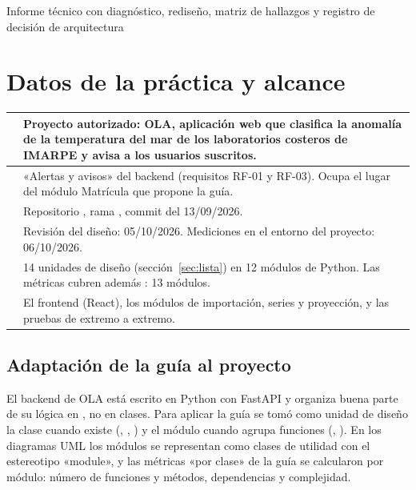\documentclass[11pt,a4paper]{article}
\begin{document}
        {Informe técnico con diagnóstico, rediseño, matriz de hallazgos y registro de decisión de arquitectura}

{\hypersetup{linkcolor=black}\renewcommand{\contentsname}{\sffamily\color{azul}Índice}\tableofcontents}
\thispagestyle{plain}
\newpage

\section{Datos de la práctica y alcance}

\begin{center}
\begin{tabularx}{\textwidth}{L{4.2cm}Y}
\hline
{} & Proyecto autorizado: OLA, aplicación web que clasifica la anomalía de la temperatura del mar de los laboratorios costeros de IMARPE y avisa a los usuarios suscritos.\\ \hline
{} & «Alertas y avisos» del backend (requisitos RF-01 y RF-03). Ocupa el lugar del módulo Matrícula que propone la guía.\\ \hline
{} & Repositorio , rama , commit  del 13/09/2026.\\ \hline
{} & Revisión del diseño: 05/10/2026. Mediciones en el entorno del proyecto: 06/10/2026.\\ \hline
{} & 14 unidades de diseño (sección~\ref{sec:lista}) en 12 módulos de Python. Las métricas cubren además : 13 módulos.\\ \hline
{} & El frontend (React), los módulos de importación, series y proyección, y las pruebas de extremo a extremo.\\ \hline
\end{tabularx}
\end{center}

\subsection{Adaptación de la guía al proyecto}

El backend de OLA está escrito en Python con FastAPI y organiza buena parte de su lógica en , no en clases. Para aplicar la guía se tomó como unidad de diseño la clase cuando existe (, , ) y el módulo cuando agrupa funciones (, ). En los diagramas UML los módulos se representan como clases de utilidad con el estereotipo «module», y las métricas «por clase» de la guía se calcularon por módulo: número de funciones y métodos, dependencias y complejidad.
\end{document}
